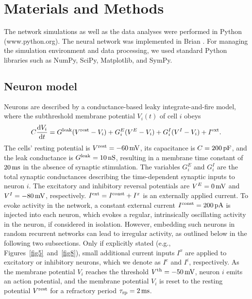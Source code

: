   \enlargethispage{3ex}



\section{Materials and Methods}
\label{sec:asss_MM}
  The network simulations as well as the data analyses were performed in Python
  (www.python.org). The neural network was implemented in Brian
  \citep{Goodman2009}. For managing the simulation environment and data
  processing, we used standard Python libraries such as NumPy, SciPy,
  Matplotlib, and SymPy.
  \subsection{Neuron model}
    Neurons are described by a conductance-based leaky integrate-and-fire model,
    where the subthreshold membrane potential $V_i(t)$ of cell $i$ obeys
    \begin{equation}
      C\frac{{\rm d}V_i}{{\rm d}t} = G^{\rm leak}(V^{\rm rest}-V_i) + G_i^E(V^E-V_i) + G_i^I(V^I-V_i)  + I^{\rm ext} .
      \label{eq:IF}
    \end{equation}
    The cells' resting potential is $V^{\rm rest}=-60\, {\rm mV}$, its
    capacitance is $C = 200 \, {\rm pF}$, and the leak conductance is $G^{\rm
    leak}=10{\rm\, nS}$, resulting in a membrane time constant of $20 \, \rm
    ms$ in the absence of synaptic stimulation. The variables $G_i^E$ and
    $G_i^I$ are the total synaptic conductances describing the time-dependent
    synaptic inputs to neuron $i$. The excitatory and inhibitory reversal
    potentials are $V^E = 0\, {\rm mV}$ and $V^I=-80\, {\rm mV}$, respectively.
    $I^{\rm ext} = I^{\rm const} + I^x$ is an externally applied current. To
    evoke activity in the network, a constant external current $I^{\rm
    const}=200 \rm\, pA$ is injected into each neuron, which evokes a regular,
    intrinsically oscillating activity in the neuron, if considered in
    isolation. However, embedding such neurons in random recurrent networks can
    lead to irregular activity, as outlined below in the following two
    subsections. Only if explicitly stated (e.g.,
    Figures~\ref{fig5}~and~\ref{fig8}), small additional current inputs $I^{x}$
    are applied to excitatory or inhibitory neurons, which we denote as $I^e$
    and $I^i$, respectively. As the membrane potential $V_i$ reaches the
    threshold $V^{\rm th}=-50\, {\rm mV}$, neuron $i$ emits an action
    potential, and the membrane potential $V_i$ is reset to the resting
    potential $V^{\rm rest}$ for a refractory period $\tau_{\rm rp} = 2 \, {\rm
    ms}$.

